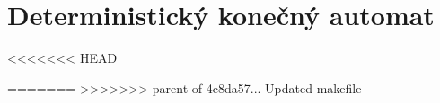 \documentclass [11pt, a4paper]{article}
\begin{document}
\newpage
\appendix

\section{Deterministický konečný automat}
<<<<<<< HEAD

=======
>>>>>>> parent of 4c8da57... Updated makefile
\end{document}
